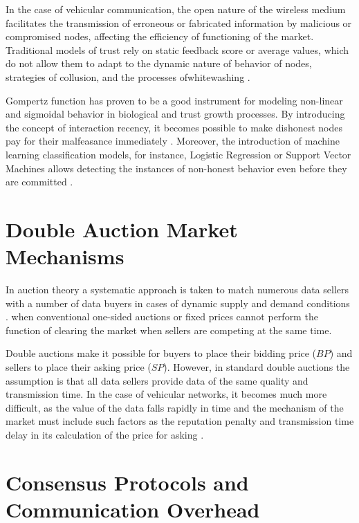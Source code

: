 \noindent
In the case of vehicular communication, the open nature of the wireless medium facilitates
the transmission of erroneous or fabricated information by malicious or compromised
nodes, affecting the efficiency of functioning of the market\cite{rosenstatter2018modelling}. Traditional models of trust rely on static feedback score or average values, which do not allow them to adapt to the dynamic nature of behavior of nodes, strategies of collusion, and the processes ofwhitewashing \cite{cui2019extensible}. 

Gompertz function has proven to be a good instrument for modeling non-linear and sigmoidal behavior in biological and trust growth processes. By introducing the concept of interaction recency, it becomes possible to make dishonest nodes pay for their malfeasance immediately \cite{chen2025lbdt}. Moreover, the introduction of machine learning classification models, for instance, Logistic Regression or Support Vector Machines allows detecting the instances of non-honest behavior even before they are committed \cite{scikit-learn}.

\section{Double Auction Market Mechanisms}\label{sec:lit_auction}

\noindent
In auction theory a systematic approach is taken to match numerous data sellers with a number of data buyers in cases of dynamic supply and demand conditions \cite{guan2020towards}. when conventional one-sided auctions or fixed prices cannot perform the function of clearing the market when sellers are competing at the same time. 

Double auctions make it possible for buyers to place their bidding price ($BP$) and sellers to place their asking price ($SP$). However, in standard double auctions the assumption is that all data sellers provide data of the same quality and transmission time. In the case of vehicular networks, it becomes much more difficult, as the value of the data falls rapidly in time and the mechanism of the market must include such factors as the reputation penalty and transmission time delay in its calculation of the price for asking \cite{chen2025lbdt}.

\section{Consensus Protocols and Communication Overhead}\label{sec:lit_consensus}

